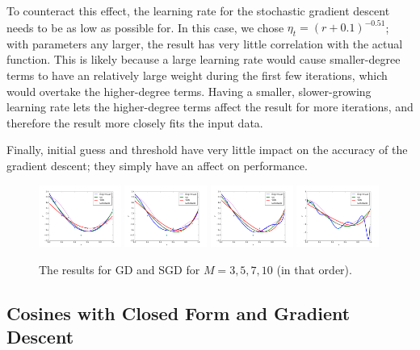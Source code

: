 \documentclass[10pt]{paper}
\begin{document}
To counteract this effect, the learning rate for the stochastic gradient descent needs to be as low as possible for. In this case, we chose $\eta_t = (r + 0.1)^{-0.51}$; with parameters any larger, the result has very little correlation with the actual function. This is likely because a large learning rate would cause smaller-degree terms to have an relatively large weight during the first few iterations, which would overtake the higher-degree terms. Having a smaller, slower-growing learning rate lets the higher-degree terms affect the result for more iterations, and therefore the result more closely fits the input data.

Finally, initial guess and threshold have very little impact on the accuracy of the gradient descent; they simply have an affect on performance.

\begin{figure}[ht!]
  \centering
  \label{fig:gd_m}
  \includegraphics[width=0.24\textwidth]{../images/all_m_3}
  \includegraphics[width=0.24\textwidth]{../images/all_m_5}
  \includegraphics[width=0.24\textwidth]{../images/all_m_7}
  \includegraphics[width=0.24\textwidth]{../images/all_m_10}
  \caption{The results for GD and SGD for $M = 3, 5, 7, 10$ (in that order).}
\end{figure}

\subsection{Cosines with Closed Form and Gradient Descent}
\end{document}
